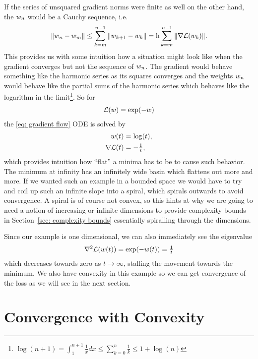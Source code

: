 If the series of unsquared gradient norms were finite as well on the other hand,
the \(w_n\) would be a Cauchy sequence, i.e.
%
\begin{align*}
	\|w_n - w_m \|
	\le \sum_{k=m}^{n-1} \|w_{k+1} - w_k\|
	= \text{h} \sum_{k=m}^{n-1} \|\nabla \mathcal{L}(w_k)\|.
\end{align*}
%
This provides us with some intuition how a situation might look like when the
gradient converges but not the sequence of \(w_n\). The gradient would
behave something like the harmonic series as its squares converges and the weights
\(w_n\) would behave like the partial sums of the harmonic series which
behaves like the logarithm in the limit\footnote{
\(
	\log(n+1) = \int_1^{n+1} \tfrac{1}x dx \le \sum_{k=0}^n \tfrac1k \le 1+ \log(n)
\)
}.
So for
%
\begin{align*}
	\mathcal{L}(w) = \exp(-w)
\end{align*}
%
the \ref{eq: gradient flow} ODE is solved by
%
\begin{align*}
	w(t) &= \log(t),\\
	\nabla \mathcal{L}(t) &= -\tfrac1t,
\end{align*}
%
which provides intuition how ``flat'' a minima has to be to cause such behavior.
The minimum at infinity has an infinitely wide basin which flattens out
more and more. If we wanted such an example in a bounded space we would have
to try and coil up such an infinite slope into a spiral, which spirals outwards
to avoid convergence. A spiral is of course not convex, so this hints
at why we are going to need a notion of increasing or infinite dimensions to
provide complexity bounds in Section~\ref{sec: complexity bounds} essentially
spiralling through the dimensions.

Since our example is one dimensional, we can also immediately see the eigenvalue
%
\begin{align*}
	\nabla^2 \mathcal{L}(w(t)) = \exp(-w(t)) = \tfrac1{t}
\end{align*}
%
which decreases towards zero as \(t\to\infty\), stalling the movement towards
the minimum.  We also have convexity in this example so we can get convergence
of the loss as we will see in the next section.

\section{Convergence with Convexity}\label{sec: convex convergence theorems}

